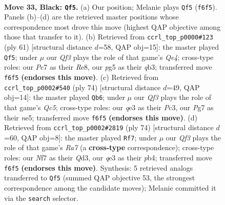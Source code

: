 \documentclass[11pt]{article}
\begin{document}
\clearpage

\begin{figure}[p]\centering
\begin{subfigure}{0.46\textwidth}\centering
\resizebox{\linewidth}{!}{%
\newchessgame
\chessboard[
  setfen={2k3r1/p1p2npp/1p2pq2/2p3P1/5P2/2P1Q2P/1P6/2KR4 b - - 0 33},
  showmover=false,
  pgfstyle=straightmove, color=movearrow, markmove={f6-f5}
]}
\caption{}
\end{subfigure}\hfill
\begin{subfigure}{0.46\textwidth}\centering
\resizebox{\linewidth}{!}{%
\newchessgame
\chessboard[
  setfen={4r1k1/1p3pp1/2p4p/p3q3/P3n3/1Q2PBPP/1P3P2/3R2K1 b - - 5 31},
  showmover=false,
  pgfstyle=straightmove, color=movearrow, markmove={e5-f5}
]}
\caption{}
\end{subfigure}
\\[4pt]
\begin{subfigure}{0.46\textwidth}\centering
\resizebox{\linewidth}{!}{%
\newchessgame
\chessboard[
  setfen={4r3/4q2k/2p4p/p1Qpnp2/4pN2/1PP3P1/P4P1P/5R1K w - - 4 38},
  showmover=false,
  pgfstyle=straightmove, color=movearrow, markmove={c5-b6}
]}
\caption{}
\end{subfigure}\hfill
\begin{subfigure}{0.46\textwidth}\centering
\resizebox{\linewidth}{!}{%
\newchessgame
\chessboard[
  setfen={2r5/R5pk/3p3p/2q1p3/1p2P1P1/PP1Q3P/2P5/1K6 w - - 3 38},
  showmover=false,
  pgfstyle=straightmove, color=movearrow, markmove={a7-f7}
]}
\caption{}
\end{subfigure}
\caption{\textbf{Move 33, Black: \texttt{Qf5}.} (a) Our position; Melanie plays \texttt{Qf5} (\texttt{f6f5}). Panels (b)--(d) are the retrieved master positions whose correspondence most drove this move (highest QAP objective among those that transfer to it). (b) Retrieved from \texttt{ccrl\_top\_p0000\#123} (ply 61) [structural distance $d$=58, QAP obj=15]: the master played \texttt{Qf5}; under $\mu$ our \emph{Qf3} plays the role of that game's \emph{Qe4}; cross-type roles: our \emph{P}c7 as their \emph{R}e8, our \emph{p}g5 as their \emph{q}b3; transferred move \texttt{f6f5} \textbf{(endorses this move)}. (c) Retrieved from \texttt{ccrl\_top\_p0002\#540} (ply 74) [structural distance $d$=49, QAP obj=14]: the master played \texttt{Qb6}; under $\mu$ our \emph{Qf3} plays the role of that game's \emph{Qc5}; cross-type roles: our \emph{q}e3 as their \emph{P}c3, our \emph{P}g7 as their \emph{n}e5; transferred move \texttt{f6f5} \textbf{(endorses this move)}. (d) Retrieved from \texttt{ccrl\_top\_p0002\#2819} (ply 74) [structural distance $d$=60, QAP obj=8]: the master played \texttt{Rf7}; under $\mu$ our \emph{Qf3} plays the role of that game's \emph{Ra7} (a \textbf{cross-type} correspondence); cross-type roles: our \emph{N}f7 as their \emph{Q}d3, our \emph{q}e3 as their \emph{p}b4; transferred move \texttt{f6f5} \textbf{(endorses this move)}. Synthesis: 5 retrieved analogs transferred to \texttt{Qf5} (summed QAP objective 53, the strongest correspondence among the candidate moves); Melanie committed it via the \texttt{search} selector.}
\label{fig:thought-m65}
\end{figure}
\end{document}
